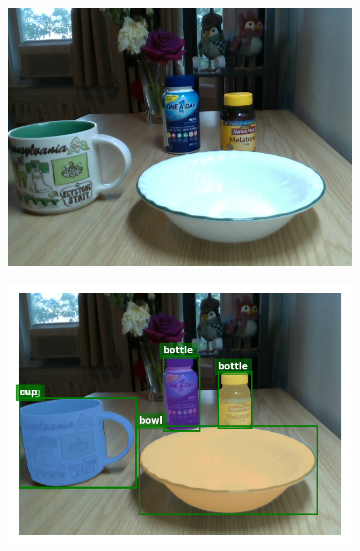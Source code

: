 \documentclass{article}
\begin{document}
\begin{figure}[]
    \begin{subfigure}{(\linewidth - 0.05\linewidth)/5}
        \centering
        \includegraphics[width=\linewidth]{figures/real2sim2real/3/1.png}
    \end{subfigure}
    \begin{subfigure}{(\linewidth - 0.05\linewidth)/5}
        \centering
        \includegraphics[width=\linewidth]{figures/real2sim2real/3/0.png}
    \end{subfigure}
    \begin{subfigure}{(\linewidth - 0.05\linewidth)/5}
        \centering

\end{subfigure}
\end{figure}
\end{document}
